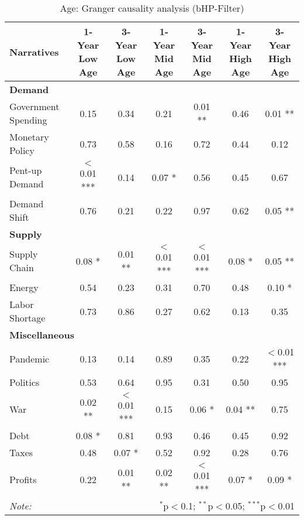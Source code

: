 \begin{sidewaystable}[ht]
\centering
\caption{Age: Granger causality analysis (bHP-Filter)}\label{table:granger}

\begin{tabular}{lcccccc}
\toprule
\textbf{Narratives} & \textbf{1-Year Low Age} & \textbf{3-Year Low Age} & \textbf{1-Year Mid Age} & \textbf{3-Year Mid Age} & \textbf{1-Year High Age} & \textbf{3-Year High Age} \\
\midrule
\multicolumn{7}{l}{\textbf{Demand}} \\
\midrule
Government Spending & 0.15 & 0.34 & 0.21 & 0.01 ** & 0.46 & 0.01 ** \\
Monetary Policy & 0.73 & 0.58 & 0.16 & 0.72 & 0.44 & 0.12 \\
Pent-up Demand & $<$0.01 *** & 0.14 & 0.07 * & 0.56 & 0.45 & 0.67 \\
Demand Shift & 0.76 & 0.21 & 0.22 & 0.97 & 0.62 & 0.05 ** \\
\midrule
\multicolumn{7}{l}{\textbf{Supply}} \\
\midrule
Supply Chain & 0.08 * & 0.01 ** & $<$0.01 *** & $<$0.01 *** & 0.08 * & 0.05 ** \\
Energy & 0.54 & 0.23 & 0.31 & 0.70 & 0.48 & 0.10 * \\
Labor Shortage & 0.73 & 0.86 & 0.27 & 0.62 & 0.13 & 0.35 \\
\midrule
\multicolumn{7}{l}{\textbf{Miscellaneous}} \\
\midrule
Pandemic & 0.13 & 0.14 & 0.89 & 0.35 & 0.22 & $<$0.01 *** \\
Politics & 0.53 & 0.64 & 0.95 & 0.31 & 0.50 & 0.95 \\
War & 0.02 ** & $<$0.01 *** & 0.15 & 0.06 * & 0.04 ** & 0.75 \\
Debt & 0.08 * & 0.81 & 0.93 & 0.46 & 0.45 & 0.92 \\
Taxes & 0.48 & 0.07 * & 0.52 & 0.92 & 0.28 & 0.76 \\
Profits & 0.22 & 0.01 ** & 0.02 ** & $<$0.01 *** & 0.07 * & 0.09 * \\
\midrule
\bottomrule
\textit{Note:}  & \multicolumn{6}{r}{$^{*}$p$<$0.1; $^{**}$p$<$0.05; $^{***}$p$<$0.01} \\
\bottomrule
\end{tabular}
\end{sidewaystable}
